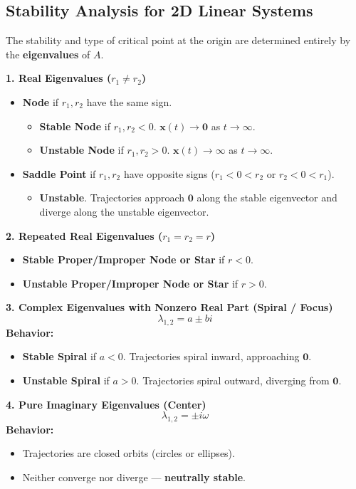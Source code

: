 \documentclass{report}
\begin{document}
\subsection*{Stability Analysis for 2D Linear Systems}
The stability and type of critical point at the origin are determined entirely by the \textbf{eigenvalues} of $A$.

\textbf{1. Real Eigenvalues ($r_1 \ne r_2$)}
\begin{itemize}
  \item \textbf{Node} if $r_1, r_2$ have the same sign.
    \begin{itemize}
      \item \textbf{Stable Node} if $r_1, r_2 < 0$. $\mathbf{x}(t) \to \mathbf{0}$ as $t \to \infty$.
      \item \textbf{Unstable Node} if $r_1, r_2 > 0$. $\mathbf{x}(t) \to \infty$ as $t \to \infty$.
    \end{itemize}
  \item \textbf{Saddle Point} if $r_1, r_2$ have opposite signs ($r_1 < 0 < r_2$ or $r_2 < 0 < r_1$).
    \begin{itemize}
      \item \textbf{Unstable}. Trajectories approach $\mathbf{0}$ along the stable eigenvector and diverge along the unstable eigenvector.
    \end{itemize}
\end{itemize}

\textbf{2. Repeated Real Eigenvalues ($r_1 = r_2 = r$)}
\begin{itemize}
  \item \textbf{Stable Proper/Improper Node or Star} if $r < 0$.
  \item \textbf{Unstable Proper/Improper Node or Star} if $r > 0$.
\end{itemize}

\textbf{3. Complex Eigenvalues with Nonzero Real Part (Spiral / Focus)}
\[
\lambda_{1,2} = a \pm bi
\]
\textbf{Behavior:}
\begin{itemize}
  \item \textbf{Stable Spiral} if $a < 0$. Trajectories spiral inward, approaching $\mathbf{0}$.
  \item \textbf{Unstable Spiral} if $a > 0$. Trajectories spiral outward, diverging from $\mathbf{0}$.
\end{itemize}

\textbf{4. Pure Imaginary Eigenvalues (Center)}
\[
\lambda_{1,2} = \pm i\omega
\]
\textbf{Behavior:}
\begin{itemize}
  \item Trajectories are closed orbits (circles or ellipses).
  \item Neither converge nor diverge --- \textbf{neutrally stable}.
\end{itemize}
\end{document}
